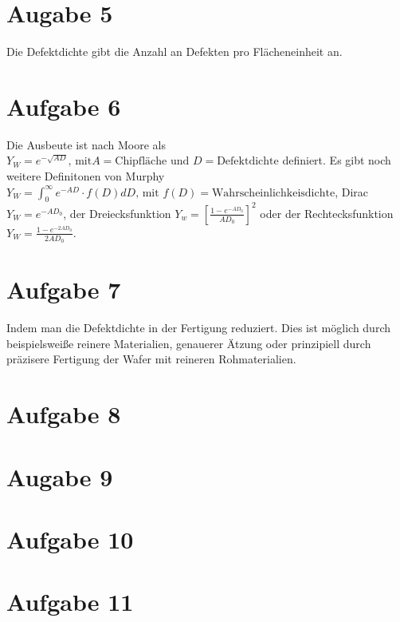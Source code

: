 \documentclass[a4paper]{scrartcl}
\begin{document}
\section*{Augabe 5}
Die Defektdichte gibt die Anzahl an Defekten pro Flächeneinheit an.


\section*{Aufgabe 6}
Die Ausbeute ist nach Moore als $Y_W = e^{-\sqrt{AD}} \text{, mit} A=\text{Chipfläche und } D=\text{Defektdichte}$ definiert. Es gibt noch weitere Definitonen von Murphy $Y_W = \int_0^{\infty} e^{-AD} \cdot f(D)dD \text{, mit }f(D)=\text{Wahrscheinlichkeisdichte}$, Dirac $Y_W=e^{-AD_0}$, der Dreiecksfunktion $Y_w=[ \frac{1-e^{-AD_0}}{AD_0} ]^2$ oder der Rechtecksfunktion $Y_W=\frac{1-e^{-2AD_0}}{2AD_0}$.


\section*{Aufgabe 7}
Indem man die Defektdichte in der Fertigung reduziert. Dies ist möglich durch beispielsweiße reinere Materialien, genauerer Ätzung oder prinzipiell durch präzisere Fertigung  der Wafer mit reineren Rohmaterialien.


\section*{Aufgabe 8}


\section*{Augabe 9}


\section*{Aufgabe 10}


\section*{Aufgabe 11}
\end{document}
